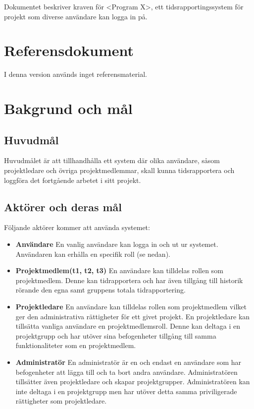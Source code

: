 \documentclass[a4paper]{article}
\begin{document}
Dokumentet beskriver kraven för <Program X>, ett tidsrapportingssystem för projekt som diverse användare kan logga in på.

\section{Referensdokument}
I denna version används inget referensmaterial.
\section{Bakgrund och mål}   
\subsection{Huvudmål}
Huvudmålet är att tillhandhålla ett system där olika användare, såsom projektledare och övriga projektmedlemmar, skall kunna tidsrapportera och loggföra det fortgående arbetet i sitt projekt. 

\subsection{Aktörer och deras mål}
Följande aktörer kommer att använda systemet:
\begin{itemize}
\item [] \textbf{Användare} En vanlig användare kan logga in och ut ur systemet.  Användaren kan erhålla en specifik roll (se nedan).
\item [] \textbf{Projektmedlem(t1, t2, t3) }En användare kan tilldelas rollen som projektmedlem. Denne kan tidrapportera och har även tillgång till historik rörande den egna samt gruppens totala tidrapportering.
\item [] \textbf{Projektledare} En användare kan tilldelas rollen som projektmedlem vilket ger den administrativa rättigheter för ett givet projekt. En projektledare kan tillsätta vanliga användare en projektmedlemsroll. Denne kan deltaga i en projektgrupp och har utöver sina befogenheter tillgång till samma funktionaliteter som en projektmedlem.
\item [] \textbf{Administratör} En administratör är en och endast en användare som har befogenheter att lägga till och ta bort andra användare. Administratören tillsätter även projektledare och skapar projektgrupper. Administratören kan inte deltaga i en projektgrupp men har utöver detta samma priviligerade rättigheter som projektledare.
\end{itemize}
\end{document}
